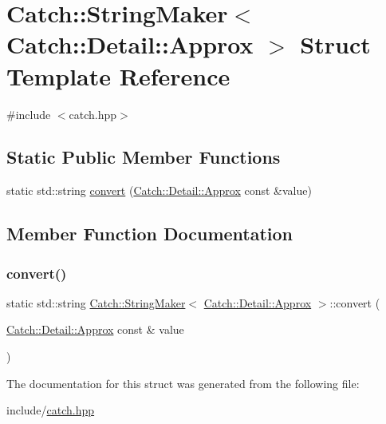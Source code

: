\hypertarget{struct_catch_1_1_string_maker_3_01_catch_1_1_detail_1_1_approx_01_4}{}\section{Catch\+::String\+Maker$<$ Catch\+::Detail\+::Approx $>$ Struct Template Reference}
\label{struct_catch_1_1_string_maker_3_01_catch_1_1_detail_1_1_approx_01_4}


{\ttfamily \#include $<$catch.\+hpp$>$}

\subsection*{Static Public Member Functions}
\begin{DoxyCompactItemize}
\item 
static std\+::string \mbox{\hyperlink{struct_catch_1_1_string_maker_3_01_catch_1_1_detail_1_1_approx_01_4_a8e5015720682fecfbff0f05de19a698f}{convert}} (\mbox{\hyperlink{class_catch_1_1_detail_1_1_approx}{Catch\+::\+Detail\+::\+Approx}} const \&value)
\end{DoxyCompactItemize}


\subsection{Member Function Documentation}
\mbox{\label{struct_catch_1_1_string_maker_3_01_catch_1_1_detail_1_1_approx_01_4_a8e5015720682fecfbff0f05de19a698f}} 
\subsubsection{\texorpdfstring{convert()}{convert()}}
{\footnotesize\ttfamily static std\+::string \mbox{\hyperlink{struct_catch_1_1_string_maker}{Catch\+::\+String\+Maker}}$<$ \mbox{\hyperlink{class_catch_1_1_detail_1_1_approx}{Catch\+::\+Detail\+::\+Approx}} $>$\+::convert (\begin{DoxyParamCaption}\item[{\mbox{\hyperlink{class_catch_1_1_detail_1_1_approx}{Catch\+::\+Detail\+::\+Approx}} const \&}]{value }\end{DoxyParamCaption})\hspace{0.3cm}{\ttfamily [static]}}



The documentation for this struct was generated from the following file\+:\begin{DoxyCompactItemize}
\item 
include/\mbox{\hyperlink{catch_8hpp}{catch.\+hpp}}\end{DoxyCompactItemize}
